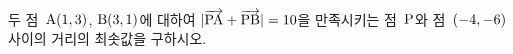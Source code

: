 두 점~$\mathrm{A}(1{,}\mkern3mu\mathopen{}3)$, $\mathrm{B}(3{,}\mkern3mu\mathopen{}1)$에 대하여 $|\overrightarrow{\mathrm{PA}}+\overrightarrow{\mathrm{PB}}|=10$을 만족시키는 점~$\mathrm{P}$와 점~$(-4{,}\mkern3mu\mathopen{}-6)$ 사이의 거리의 최솟값을 구하시오.
